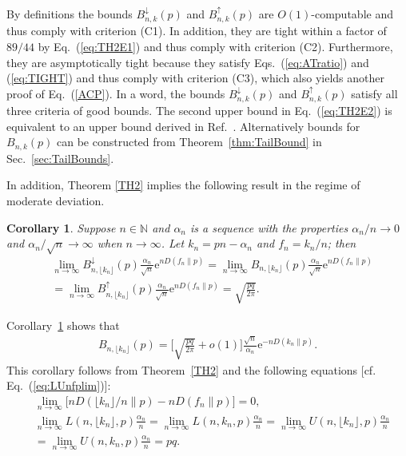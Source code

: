 \documentclass[aop]{imsart}
\theoremstyle{plain}
\newtheorem{corollary}[theorem]{Corollary}
\theoremstyle{remark}
\newcommand{\rme}{\mathrm{e}}
\newcommand{\bbN}{\mathbb{N}}
\newcommand{\1}{\operatorname{\uppercase\expandafter{\romannumeral1}}}
\newcommand{\2}{\operatorname{\uppercase\expandafter{\romannumeral2}}}
\newcommand{\3}{\operatorname{\uppercase\expandafter{\romannumeral3}}}
\newcommand{\4}{\operatorname{\uppercase\expandafter{\romannumeral4}}}
\newcommand{\5}{\operatorname{\uppercase\expandafter{\romannumeral5}}}
\newcommand{\6}{\operatorname{\uppercase\expandafter{\romannumeral6}}}
\newcommand{\7}{\operatorname{\uppercase\expandafter{\romannumeral7}}}
\newcommand{\8}{\operatorname{\uppercase\expandafter{\romannumeral8}}}
\newcommand{\9}{\operatorname{\uppercase\expandafter{\romannumeral9}}}
\newcommand{\eref}[1]{Eq.~\textup{(\ref{#1})}}
\newcommand{\eqsref}[2]{Eqs.~(\ref{#1}) and (\ref{#2})}
\newcommand{\thref}[1]{Theorem~\ref{#1}}
\newcommand{\Crref}[1]{Corollary~\ref{#1}}
\newcommand{\sref}[1]{Sec.~\ref{#1}}
\newcommand{\rcite}[1]{Ref.~\cite{#1}}
\begin{document}
By definitions the bounds $B_{n,k}^{\downarrow}(p)$
and $B_{n,k}^{\uparrow}(p)$  are $O(1)$-computable and thus comply with criterion (C1). In addition, they 
are tight within  a factor of $89/44$ by \eref{eq:TH2E1} and thus comply with   criterion (C2). Furthermore,  they  are  asymptotically tight because they satisfy  \eqsref{eq:ATratio}{eq:TIGHT} and thus comply with  criterion (C3), which also yields another proof of \eref{ACP}.
In a word, the bounds $B_{n,k}^{\downarrow}(p)$
and $B_{n,k}^{\uparrow}(p)$ satisfy all  three criteria of good bounds. The
second upper bound in \eref{eq:TH2E2} is equivalent to an upper bound derived in \rcite{Ferr21}.
 Alternatively bounds for $B_{n,k}(p)$ can be constructed from \thref{thm:TailBound} in \sref{sec:TailBounds}.



In addition, Theorem \ref{TH2} implies the following result in the regime of moderate deviation.
\begin{corollary}\label{cor:ModerateDev}
Suppose $n\in \bbN$ and $\alpha_n$ is a sequence with the properties $\alpha_n/n \to 0$ and $\alpha_n/\sqrt{n}\to \infty$ when $n\to\infty$. Let $ k_n=pn-\alpha_n$ and $f_n=k_n/n$; then 
	\begin{align}
&\lim_{n \to \infty}
	B_{n,\lfloor k_n\rfloor}^{\downarrow}(p)
	\frac{\alpha_n}{\sqrt{n }}
	\rme^{nD(f_n\|p)}=\lim_{n \to \infty}
	B_{n,\lfloor k_n\rfloor}(p)
	\frac{\alpha_n}{\sqrt{n }}
	\rme^{nD(f_n\|p)}\\
	&= \lim_{n \to \infty}
	B_{n,\lfloor k_n\rfloor}^{\uparrow}(p)
	\frac{\alpha_n}{\sqrt{n }}
	\rme^{nD(f_n\|p)}
	= \sqrt{\frac{pq }{2\pi}}. 	\nonumber
	\end{align}
\end{corollary}
\Crref{cor:ModerateDev} shows that 
\begin{align}
B_{n,\lfloor k_n\rfloor}(p)=\biggl[ \sqrt{\frac{pq }{2\pi}}+o(1)\biggr]
\frac{\sqrt{n}}{\alpha_n}\rme^{-nD(k_n\|p)}.
\end{align}
This corollary follows from \thref{TH2} and the following equations [cf. \eref{eq:LUnfplim}]:
\begin{align}
&\lim_{n\to\infty}\bigl[nD(\lfloor k_n\rfloor/n\|p)-nD(f_n\|p)\bigr]=0,\\
&\lim_{n\rightarrow \infty} L(n,\lfloor k_n\rfloor,p)\frac{\alpha_n}{n}=\lim_{n\rightarrow \infty} L(n,k_n,p)\frac{\alpha_n}{n}
=\lim_{n\rightarrow \infty} U(n,\lfloor k_n\rfloor,p)\frac{\alpha_n}{n}\label{eq:LUlimModerate}\\
&=\lim_{n\rightarrow \infty} U(n,k_n,p)\frac{\alpha_n}{n}
=pq.\nonumber
\end{align}
\end{document}
